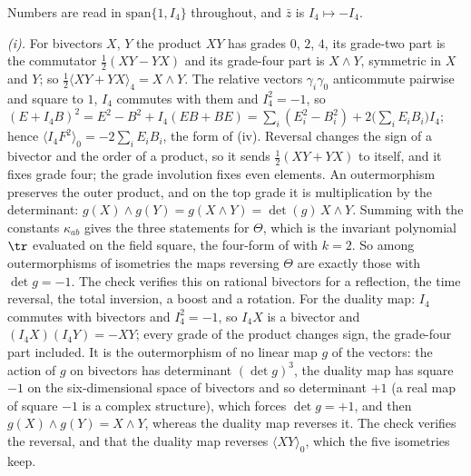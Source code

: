 Numbers are read in $\mathrm{span}\{1, I_{4}\}$ throughout, and $\bar{z}$ is $I_{4} \mapsto -I_{4}$.

\emph{(i).} For bivectors $X$, $Y$ the product $XY$ has grades $0$, $2$, $4$, its grade-two part is the commutator $\tfrac12(XY - YX)$ and its grade-four part is $X \wedge Y$, symmetric in $X$ and $Y$; so $\tfrac12\langle XY + YX\rangle_{4} = X \wedge Y$. The relative vectors $\gamma_{i}\gamma_{0}$ anticommute pairwise and square to $1$, $I_{4}$ commutes with them and $I_{4}^{2} = -1$, so $(E + I_{4}B)^{2} = E^{2} - B^{2} + I_{4}(EB + BE) = \sum_{i}(E_{i}^{2} - B_{i}^{2}) + 2\bigl(\sum_{i}E_{i}B_{i}\bigr)I_{4}$; hence $\langle I_{4}F^{2}\rangle_{0} = -2\sum_{i}E_{i}B_{i}$, the form of (iv). Reversal changes the sign of a bivector and the order of a product, so it sends $\tfrac12(XY + YX)$ to itself, and it fixes grade four; the grade involution fixes even elements. An outermorphism preserves the outer product, and on the top grade it is multiplication by the determinant: $g(X) \wedge g(Y) = g(X \wedge Y) = \det(g)\,X \wedge Y$. Summing with the constants $\kappa_{ab}$ gives the three statements for $\Theta$, which is the invariant polynomial $\tr$ evaluated on the field square, the four-form of  with $k = 2$. So among outermorphisms of isometries the maps reversing $\Theta$ are exactly those with $\det g = -1$. The check verifies this on rational bivectors for a reflection, the time reversal, the total inversion, a boost and a rotation. For the duality map: $I_{4}$ commutes with bivectors and $I_{4}^{2} = -1$, so $I_{4}X$ is a bivector and $(I_{4}X)(I_{4}Y) = -XY$; every grade of the product changes sign, the grade-four part included. It is the outermorphism of no linear map $g$ of the vectors: the action of $g$ on bivectors has determinant $(\det g)^{3}$, the duality map has square $-1$ on the six-dimensional space of bivectors and so determinant $+1$ (a real map of square $-1$ is a complex structure), which forces $\det g = +1$, and then $g(X) \wedge g(Y) = X \wedge Y$, whereas the duality map reverses it. The check verifies the reversal, and that the duality map reverses $\langle XY\rangle_{0}$, which the five isometries keep.

